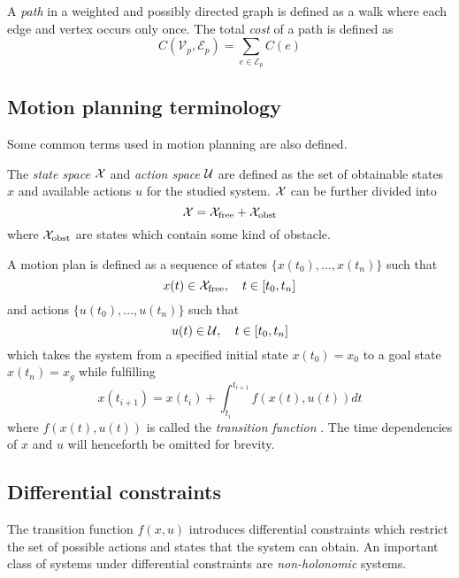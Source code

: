 \begin{definition}[Path]
    A \textit{path} in a weighted and possibly directed graph is defined as a walk where each edge and vertex occurs only once.
    The total \textit{cost} of a path is defined as
    \begin{equation}
        C(\mathcal{V}_p, \mathcal{E}_p)=\sum_{e\in\mathcal{E}_p}C(e)
    \end{equation}
\end{definition}

\subsection{Motion planning terminology}
Some common terms used in motion planning are also defined.

\begin{definition}
    The \textit{state space} $\mathcal{X}$ and \textit{action space}
    $\mathcal{U}$ are defined as the set of obtainable states $x$ and available actions $u$ for the
    studied system.
    $\mathcal{X}$ can be further divided into
    \begin{equation}
        \mathcal{X} = \mathcal{X}_{\text{free}} + \mathcal{X}_{\text{obst}}
    \end{equation}
    where $\mathcal{X}_{\text{obst}}$ are states which contain some kind of obstacle. 
\end{definition}

\begin{definition}
    A motion plan is defined as a sequence of states $\{x(t_0),\hdots, x(t_n)\}$ such that
    \begin{equation}
        x(t)\in\mathcal{X}_{\text{free}}, \quad t\in[t_0,t_n]
    \end{equation}
    and actions $\{u(t_0),\hdots,u(t_n)\}$ such that
    \begin{equation}
        u(t)\in\mathcal{U}, \quad t\in[t_0,t_n]
    \end{equation}
    which takes the system from a specified initial state $x(t_0)=x_0$ to a 
    goal state $x(t_n)=x_g$ while fulfilling
    \begin{equation}
        x(t_{i+1})=x(t_i) + \int_{t_i}^{t_{i+1}} f(x(t), u(t)) dt
    \end{equation}
    where $f(x(t), u(t))$ is called the \textit{transition function} \cite{planning_algorithms}. The time dependencies of $x$ and $u$ will henceforth be 
    omitted for brevity.
\end{definition}

\subsection{Differential constraints}
The transition function $f(x, u)$ introduces differential constraints which restrict the set of possible actions and states that 
the system can obtain. An important class of systems under differential constraints 
are \textit{non-holonomic} systems.

